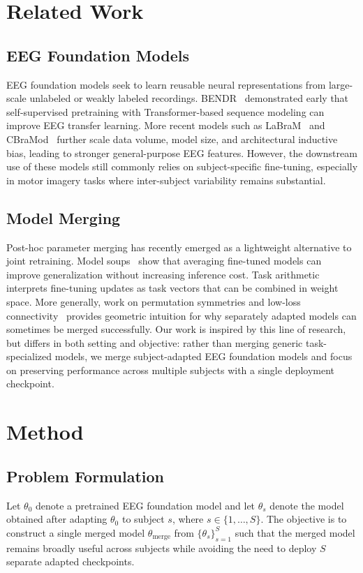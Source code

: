 \documentclass[conference]{IEEEtran}
\begin{document}
\section{Related Work}
\subsection{EEG Foundation Models}
EEG foundation models seek to learn reusable neural representations from large-scale unlabeled or weakly labeled recordings. BENDR~\cite{b1} demonstrated early that self-supervised pretraining with Transformer-based sequence modeling can improve EEG transfer learning. More recent models such as LaBraM~\cite{b2} and CBraMod~\cite{b3} further scale data volume, model size, and architectural inductive bias, leading to stronger general-purpose EEG features. However, the downstream use of these models still commonly relies on subject-specific fine-tuning, especially in motor imagery tasks where inter-subject variability remains substantial.

\subsection{Model Merging}
Post-hoc parameter merging has recently emerged as a lightweight alternative to joint retraining. Model soups~\cite{b4} show that averaging fine-tuned models can improve generalization without increasing inference cost. Task arithmetic~\cite{b5} interprets fine-tuning updates as task vectors that can be combined in weight space. More generally, work on permutation symmetries and low-loss connectivity~\cite{b6,b7} provides geometric intuition for why separately adapted models can sometimes be merged successfully. Our work is inspired by this line of research, but differs in both setting and objective: rather than merging generic task-specialized models, we merge subject-adapted EEG foundation models and focus on preserving performance across multiple subjects with a single deployment checkpoint.

\section{Method}
\subsection{Problem Formulation}
Let $\theta_{0}$ denote a pretrained EEG foundation model and let $\theta_{s}$ denote the model obtained after adapting $\theta_{0}$ to subject $s$, where $s \in \{1,\ldots,S\}$. The objective is to construct a single merged model $\theta_{\mathrm{merge}}$ from $\{\theta_{s}\}_{s=1}^{S}$ such that the merged model remains broadly useful across subjects while avoiding the need to deploy $S$ separate adapted checkpoints.
\end{document}
